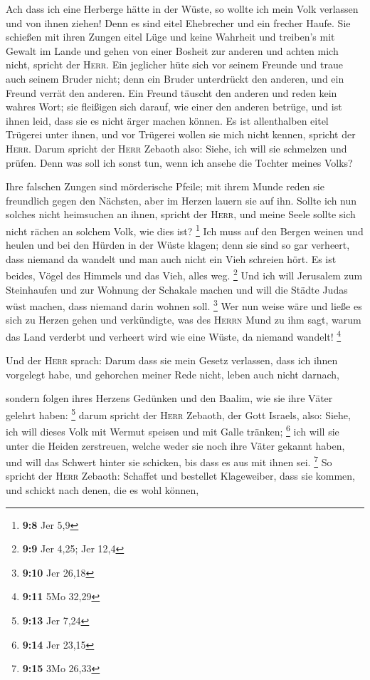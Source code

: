  Ach dass ich eine Herberge hätte in der Wüste, so wollte
ich mein Volk verlassen und von ihnen ziehen! Denn es sind eitel
Ehebrecher und ein frecher Haufe.  Sie schießen mit ihren
Zungen eitel Lüge und keine Wahrheit und treiben's mit Gewalt im Lande
und gehen von einer Bosheit zur anderen und achten mich nicht, spricht
der \textsc{Herr}.  Ein jeglicher hüte sich vor seinem
Freunde und traue auch seinem Bruder nicht; denn ein Bruder unterdrückt
den anderen, und ein Freund verrät den anderen.  Ein
Freund täuscht den anderen und reden kein wahres Wort; sie fleißigen
sich darauf, wie einer den anderen betrüge, und ist ihnen leid, dass sie
es nicht ärger machen können.  Es ist allenthalben eitel
Trügerei unter ihnen, und vor Trügerei wollen sie mich nicht kennen,
spricht der \textsc{Herr}.  Darum spricht der
\textsc{Herr} Zebaoth also: Siehe, ich will sie schmelzen und prüfen.
Denn was soll ich sonst tun, wenn ich ansehe die Tochter meines Volks?

 Ihre falschen Zungen sind mörderische Pfeile; mit ihrem
Munde reden sie freundlich gegen den Nächsten, aber im Herzen lauern sie
auf ihn.  Sollte ich nun solches nicht heimsuchen an
ihnen, spricht der \textsc{Herr}, und meine Seele sollte sich nicht
rächen an solchem Volk, wie dies ist? \footnote{\textbf{9:8} Jer 5,9}
 Ich muss auf den Bergen weinen und heulen und bei den
Hürden in der Wüste klagen; denn sie sind so gar verheert, dass niemand
da wandelt und man auch nicht ein Vieh schreien hört. Es ist beides,
Vögel des Himmels und das Vieh, alles weg. \footnote{\textbf{9:9} Jer
  4,25; Jer 12,4}  Und ich will Jerusalem zum Steinhaufen
und zur Wohnung der Schakale machen und will die Städte Judas wüst
machen, dass niemand darin wohnen soll. \footnote{\textbf{9:10} Jer
  26,18}  Wer nun weise wäre und ließe es sich zu Herzen
gehen und verkündigte, was des \textsc{Herrn} Mund zu ihm sagt, warum
das Land verderbt und verheert wird wie eine Wüste, da niemand wandelt!
\footnote{\textbf{9:11} 5Mo 32,29}

 Und der \textsc{Herr} sprach: Darum dass sie mein Gesetz
verlassen, dass ich ihnen vorgelegt habe, und gehorchen meiner Rede
nicht, leben auch nicht darnach,

 sondern folgen ihres Herzens Gedünken und den Baalim,
wie sie ihre Väter gelehrt haben: \footnote{\textbf{9:13} Jer 7,24}
 darum spricht der \textsc{Herr} Zebaoth, der Gott
Israels, also: Siehe, ich will dieses Volk mit Wermut speisen und mit
Galle tränken; \footnote{\textbf{9:14} Jer 23,15}  ich
will sie unter die Heiden zerstreuen, welche weder sie noch ihre Väter
gekannt haben, und will das Schwert hinter sie schicken, bis dass es aus
mit ihnen sei. \footnote{\textbf{9:15} 3Mo 26,33}  So
spricht der \textsc{Herr} Zebaoth: Schaffet und bestellet Klageweiber,
dass sie kommen, und schickt nach denen, die es wohl können,

